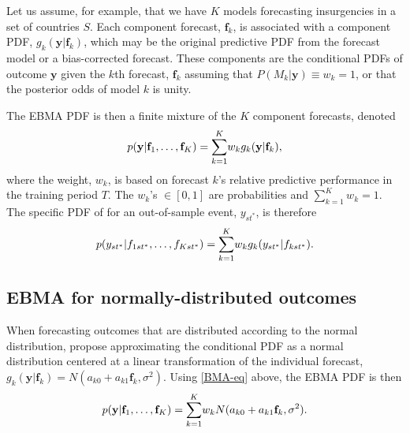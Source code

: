 \documentclass[pdftex,12pt,fullpage,oneside]{amsart}
\begin{document}
Let us assume, for example, that we have $K$ models forecasting
insurgencies in a set of countries $S$. Each component forecast,
$\mathbf{f}_k$, is associated with a component PDF,
$g_k(\mathbf{y}|\mathbf{f}_k)$, which may be the original predictive
PDF from the forecast model or a bias-corrected forecast.  These
components are the conditional PDFs of outcome $\mathbf{y}$ given the
$k$th forecast, $\mathbf{f}_k$ assuming that $P(M_k | \mathbf{y})
\equiv w_k=1$, or that the posterior odds of model $k$ is unity.



The EBMA PDF is then a finite mixture of the $K$ component forecasts,
denoted
\begin{equation}
\small
\label{BMA-eq}
p(\mathbf{y}|\mathbf{f}_1, \ldots, \mathbf{f}_K)=\overset{K}{\underset{k=1}{\sum}} w_k
g_k(\mathbf{y}|\mathbf{f}_k),
\end{equation}
\noindent where the weight, $w_k$, is based on forecast $k$'s relative
predictive performance in the training period $T$. The $w_k$'s $\in
[0,1]$ are probabilities and $\sum_{k=1}^Kw_k=1$.  The specific PDF of
for an out-of-sample event, $y_{st^*}$, is therefore
\begin{equation}
\label{BMA-eq2}
\small
p(y_{st^*}|f_{1st^*}, \ldots,
f_{Kst^*})=\overset{K}{\underset{k=1}{\sum}} w_k
g_k(y_{st^*}|f_{kst^*}).
\end{equation}
\subsection{EBMA for normally-distributed outcomes}

When forecasting outcomes that are distributed according to the normal
distribution, \citet{Raftery:2005} propose approximating the
conditional PDF as a normal distribution centered at a linear
transformation of the individual forecast, $g_k(\mathbf{y}|\mathbf{f}_k) = N(a_{k0} + a_{k1}\mathbf{f}_k,
\sigma^2)$.  Using \eqref{BMA-eq} above, the EBMA PDF is then
\begin{equation} \small
p(\mathbf{y}|\mathbf{f}_1, \ldots, \mathbf{f}_K) = \overset{K}{\underset{k=1}{\sum}} w_k N(a_{k0} +
a_{k1}\mathbf{f}_k, \sigma^2).
\end{equation}
\end{document}
